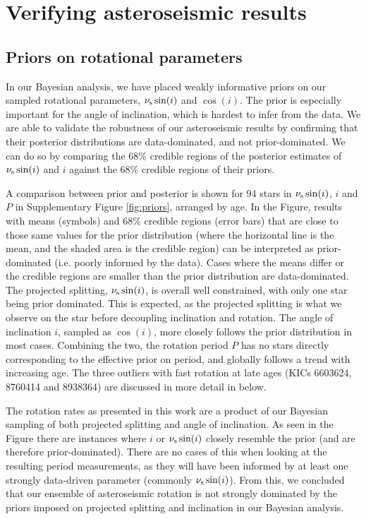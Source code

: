 \section{Verifying asteroseismic results}
\subsection{Priors on rotational parameters}
In our Bayesian analysis, we have placed weakly informative priors on our sampled rotational parameters, $\nu_{\rm s}\sin(i)$ and $\cos(i)$. The prior is especially important for the angle of inclination, which is hardest to infer from the data. We are able to validate the robustness of our asteroseismic results by confirming that their posterior distributions are data-dominated, and not prior-dominated. We can do so by comparing the $68\%$ credible regions of the posterior estimates of $\nu_{\rm s}\sin(i)$ and $i$ against the $68\%$ credible regions of their priors.

A comparison between prior and posterior is shown for 94 stars in $\nu_{\rm s}\sin(i)$, $i$ and $P$ in Supplementary Figure \ref{fig:priors}, arranged by age. In the Figure, results with means (symbols) and $68\%$ credible regions (error bars) that are close to those same values for the prior distribution (where the horizontal line is the mean, and the shaded area is the credible region) can be interpreted as prior-dominated (i.e. poorly informed by the data). Cases where the means differ or the credible regions are smaller than the prior distribution are data-dominated. The projected splitting, $\nu_{\rm s}\sin(i)$, is overall well constrained, with only one star being prior dominated. This is expected, as the projected splitting is what we observe on the star before decoupling inclination and rotation. The angle of inclination $i$, sampled as $\cos(i)$, more closely follows the prior distribution in most cases. Combining the two, the rotation period $P$ has no stars directly corresponding to the effective prior on period, and globally follows a trend with increasing age. The three outliers with fast rotation at late ages (KICs 6603624, 8760414 and 8938364) are discussed in more detail in below.

The rotation rates as presented in this work are a product of our Bayesian sampling of both projected splitting and angle of inclination. As seen in the Figure there are instances where $i$ or $\nu_{\rm s}\sin(i)$ closely resemble the prior (and are therefore prior-dominated). There are no cases of this when looking at the resulting period measurements, as they will have been informed by at least one strongly data-driven parameter (commonly $\nu_{\rm s}\sin(i)$). From this, we concluded that our ensemble of asteroseismic rotation is not strongly dominated by the priors imposed on projected splitting and inclination in our Bayesian analysis.


